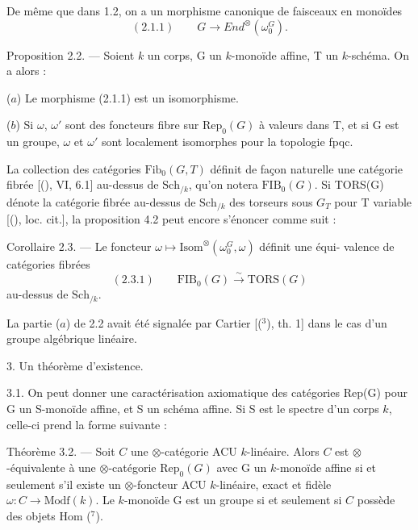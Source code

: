 
De même que dans 1.2, on a un morphisme canonique de faisceaux
en monoïdes
\[ (2.1.1) \qquad G \to End^{\otimes}(\omega_0^G). \]

Proposition 2.2. --- Soient $k$ un corps, G un $k$-monoïde affine, T un
$k$-schéma. On a alors :

($a$) Le morphisme (2.1.1) est un isomorphisme.

($b$) Si $\omega$, $\omega'$ sont des foncteurs fibre sur $\mathrm{Rep}_0(G)$ à valeurs dans T, et
si G est un groupe, $\omega$ et $\omega'$ sont localement isomorphes pour la topologie fpqc.

La collection des catégories $\mathrm{Fib}_0(G, T)$ définit de façon naturelle une
catégorie fibrée [(), VI, 6.1] au-dessus de $\mathrm{Sch}_{/k}$, qu'on notera $\mathrm{FIB}_0(G)$.
Si TORS(G) dénote la catégorie fibrée au-dessus de $\mathrm{Sch}_{/k}$ des torseurs
sous $G_T$ pour T variable [(), loc. cit.], la proposition 4.2 peut encore
s'énoncer comme suit :

Corollaire 2.3. --- Le foncteur $\omega \mapsto \mathrm{Isom}^{\otimes}(\omega_0^G, \omega)$ définit une équi-%
valence de catégories fibrées
\[ (2.3.1) \qquad \mathrm{FIB}_0(G) \xrightarrow{\sim} \mathrm{TORS}(G) \]
au-dessus de $\mathrm{Sch}_{/k}$.

La partie ($a$) de 2.2 avait été signalée par Cartier [(${}^3$), th. 1] dans le
cas d'un groupe algébrique linéaire.

3. Un théorème d'existence.

3.1. On peut donner une caractérisation axiomatique des catégories
Rep(G) pour G un S-monoïde affine, et S un schéma affine. Si S est le
spectre d'un corps $k$, celle-ci prend la forme suivante :

Théorème 3.2. --- Soit $C$ une $\otimes$-catégorie ACU $k$-linéaire. Alors $C$ est
$\otimes$-équivalente à une $\otimes$-catégorie $\mathrm{Rep}_0(G)$ avec G un $k$-monoïde affine si
et seulement s'il existe un $\otimes$-foncteur ACU $k$-linéaire, exact et fidèle
$\omega : C \to \mathrm{Modf}(k)$. Le $k$-monoïde G est un groupe si et seulement si $C$ possède
des objets Hom (${}^7$).

